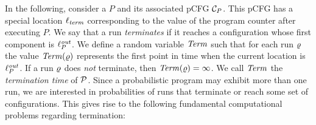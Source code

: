 \smallskip{}
In the following, consider a \PP{} $P$ and its associated pCFG $\mathcal{C}_P$. This 
pCFG has a special location  $\ell_{\mathit{term}}$ corresponding to the value of 
the program counter after 
executing $P$.
We say that a run 
\emph{terminates} if it reaches a 
configuration whose first component is
$\ell_{P}^{\mathit{out}}$.
%
We define a random variable $\mathit{Term}$
such that for each run $\varrho$ the value $\mathit{Term}(\varrho)$ represents 
the first 
point in time when 
the current location is $\ell_P^{\mathit{out}}$. If a run $\varrho$ does 
\emph{not} 
terminate, then 
$\mathit{Term}(\varrho)=\infty$. We call $\mathit{Term}$ the 
\emph{termination time} of $\mathcal{P}$. 
Since a probabilistic program may exhibit more than one run, we are interested 
in probabilities of runs that terminate or reach some set of configurations. 
This gives rise to the following fundamental computational problems regarding 
termination:


